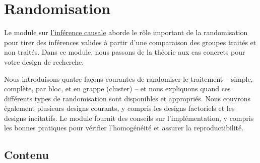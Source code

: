 \documentclass[
  12pt,
]{book}
\begin{document}
\hypertarget{randomisation}{%
\chapter{Randomisation}\label{randomisation}}

Le module sur \href{causal-inference.html}{l'inférence causale} aborde le rôle important de la randomisation pour tirer des inférences valides à partir d'une comparaison des groupes traités et non traités. Dans ce module, nous passons de la théorie aux cas concrets pour votre design de recherche.

Nous introduisons quatre façons courantes de randomiser le traitement -- simple, complète, par bloc, et en grappe (cluster) -- et nous expliquons quand ces différents types de randomisation sont disponibles et appropriés. Nous couvrons également plusieurs designs courants, y compris les designs factoriels et les designs incitatifs. Le module fournit des conseils sur l'implémentation, y compris les bonnes pratiques pour vérifier l'homogénéité et assurer la reproductibilité.

\hypertarget{contenu-2}{%
\section{Contenu}\label{contenu-2}}
\end{document}
